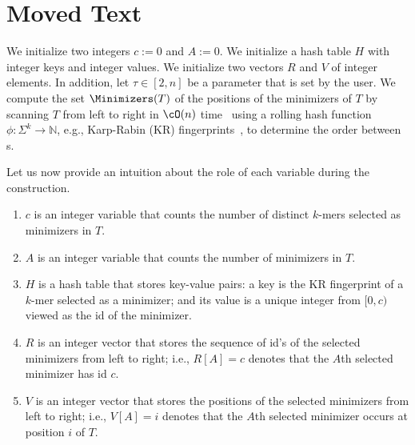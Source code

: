 \section{Moved Text}

We initialize two integers $c := 0$ and $A:=0$.
We initialize a hash table $H$ with integer keys and integer values.
We initialize two vectors $R$ and $V$ of integer elements.
In addition, let $\tau\in[2, n]$ be a parameter that is set by the user.
We compute the set $\Minimizers(T)$ of the positions of the minimizers of $T$
by scanning $T$ from left to right in $\cO(n)$ time~\cite{DBLP:journals/tkde/LoukidesPS23} using a rolling hash function $\phi : \Sigma^k \to \mathbb{N}$, e.g., Karp-Rabin (KR) fingerprints~\cite{DBLP:journals/ibmrd/KarpR87}, to determine the order between {\kmer}s.

Let us now provide an intuition about the role of each variable during the construction.

\begin{enumerate}
    \item $c$ is an integer variable that counts the number of distinct $k$-mers selected as minimizers in $T$.
    \item $A$ is an integer variable that counts the number of minimizers in $T$.
    \item $H$ is a hash table that stores key-value pairs: a key is the KR
      fingerprint of a $k$-mer selected as a minimizer; and its value is a
      unique integer from $[0,c)$ viewed as the id of the minimizer.
    \item $R$ is an integer vector that stores the sequence of id's of the selected minimizers from left to right; i.e., $R[A]=c$ denotes that the $A$th selected minimizer has id $c$.
    \item $V$ is an integer vector that stores the positions of the selected minimizers from left to right; i.e., $V[A]=i$ denotes that the $A$th selected minimizer occurs at position $i$ of $T$.
\end{enumerate}

